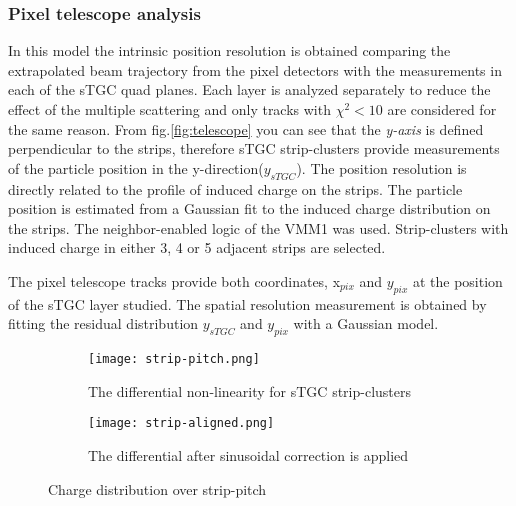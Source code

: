 	\subsubsection{Pixel telescope analysis}
	In this model the intrinsic position resolution is obtained comparing the extrapolated beam trajectory from the pixel detectors
	with the measurements in each of the sTGC quad planes. Each layer is analyzed separately to reduce the effect of the
	multiple scattering and only tracks with $\chi^2<10$ are considered for the same reason. From fig.\ref{fig:telescope}
	you can see that the {\it y-axis} is defined perpendicular to the strips, therefore sTGC strip-clusters provide
	measurements of the particle position in the y-direction($y_{sTGC}$).
	The position resolution is directly related to the profile of induced charge on the strips. The particle position is
	estimated from a Gaussian fit to the induced charge distribution on the strips. The neighbor-enabled logic of the VMM1
	was used. Strip-clusters with induced charge in either 3, 4 or 5 adjacent strips are selected.\par
	The pixel telescope tracks provide both coordinates, x$_{pix}$ and $y_{pix}$ at the position of the sTGC layer studied. The
	spatial resolution measurement is obtained by fitting the residual distribution $y_{sTGC}$  and $y_{pix}$ with a Gaussian model.\par


	\begin{figure}[ht]
		\centering
		\hspace*{\fill}
		\begin{subfigure}[b]{0.45\textwidth}
			\centering
			\texttt{[image: strip-pitch.png]}
			\caption{The differential non-linearity for sTGC strip-clusters}\label{fig:pitchfit}
		\end{subfigure}
		\hfill
		\begin{subfigure}[b]{0.45\textwidth}
			\centering
			\texttt{[image: strip-aligned.png]}
			\caption{The differential after sinusoidal correction is applied}\label{fig:pitchaligned}
		\end{subfigure}
		\hspace*{\fill}
		\caption{Charge distribution over strip-pitch}\label{fig:strip-pitch}
	\end{figure}


